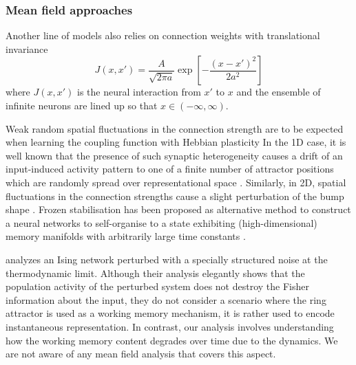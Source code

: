\documentclass{article} %
\newcounter{ct}
\theoremstyle{definition}
\theoremstyle{remark}
\begin{document}
\subsubsection{Mean field approaches}
Another line of models	\citep{miller2006analysis,wu2008dynamics,fung2010} also relies on connection weights with translational invariance
\begin{equation}
J(x, x') = \frac{A}{\sqrt{2\pi a}} \exp\left[ -\frac{(x - x')^2}{2a^2} \right]
\end{equation}
where \(J (x, x')\) is the neural interaction from \(x'\) to \(x\) and the ensemble of infinite neurons are lined up so that \(x\in (-\infty, \infty)\).

Weak random spatial fluctuations in the connection strength are to be expected when learning the coupling function with Hebbian plasticity
In the 1D case, it is well known that the presence of such synaptic heterogeneity causes a drift of an input-induced activity pattern to one of a finite number of attractor positions which are randomly spread over representational space \citep{Renart2003,itskov2011}.
Similarly, in 2D, spatial fluctuations in the connection strengths cause a slight perturbation of the bump shape \citep{wojtak2023robust}.
Frozen stabilisation has been proposed as alternative method to construct a neural networks to self-organise to a state exhibiting (high-dimensional) memory manifolds with arbitrarily large time constants \citep{can2021emergence}. %



\citep{kuhn2023information} analyzes an Ising network perturbed with a specially structured noise at the thermodynamic limit.
Although their analysis elegantly shows that the population activity of the perturbed system does not destroy the Fisher information about the input, they do not consider a scenario where the ring attractor is used as a working memory mechanism, it is rather used to encode instantaneous representation.
In contrast, our analysis involves understanding how the working memory content degrades over time due to the dynamics. We are not aware of any mean field analysis that covers this aspect.
\end{document}
